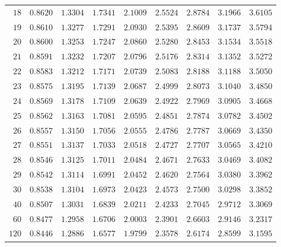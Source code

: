 \begin{tabular}{rrrrrrrrr}
  $18$ & $0.8620$ & $1.3304$ & $1.7341$ & $2.1009$ & $2.5524$ & $2.8784$ & $3.1966$ & $3.6105$ \\ 
  $19$ & $0.8610$ & $1.3277$ & $1.7291$ & $2.0930$ & $2.5395$ & $2.8609$ & $3.1737$ & $3.5794$ \\ 
  $20$ & $0.8600$ & $1.3253$ & $1.7247$ & $2.0860$ & $2.5280$ & $2.8453$ & $3.1534$ & $3.5518$ \\ 
  $21$ & $0.8591$ & $1.3232$ & $1.7207$ & $2.0796$ & $2.5176$ & $2.8314$ & $3.1352$ & $3.5272$ \\ 
  $22$ & $0.8583$ & $1.3212$ & $1.7171$ & $2.0739$ & $2.5083$ & $2.8188$ & $3.1188$ & $3.5050$ \\ 
  $23$ & $0.8575$ & $1.3195$ & $1.7139$ & $2.0687$ & $2.4999$ & $2.8073$ & $3.1040$ & $3.4850$ \\ 
  $24$ & $0.8569$ & $1.3178$ & $1.7109$ & $2.0639$ & $2.4922$ & $2.7969$ & $3.0905$ & $3.4668$ \\ 
  $25$ & $0.8562$ & $1.3163$ & $1.7081$ & $2.0595$ & $2.4851$ & $2.7874$ & $3.0782$ & $3.4502$ \\ 
  $26$ & $0.8557$ & $1.3150$ & $1.7056$ & $2.0555$ & $2.4786$ & $2.7787$ & $3.0669$ & $3.4350$ \\ 
  $27$ & $0.8551$ & $1.3137$ & $1.7033$ & $2.0518$ & $2.4727$ & $2.7707$ & $3.0565$ & $3.4210$ \\ 
  $28$ & $0.8546$ & $1.3125$ & $1.7011$ & $2.0484$ & $2.4671$ & $2.7633$ & $3.0469$ & $3.4082$ \\ 
  $29$ & $0.8542$ & $1.3114$ & $1.6991$ & $2.0452$ & $2.4620$ & $2.7564$ & $3.0380$ & $3.3962$ \\ 
  $30$ & $0.8538$ & $1.3104$ & $1.6973$ & $2.0423$ & $2.4573$ & $2.7500$ & $3.0298$ & $3.3852$ \\ 
  $40$ & $0.8507$ & $1.3031$ & $1.6839$ & $2.0211$ & $2.4233$ & $2.7045$ & $2.9712$ & $3.3069$ \\ 
  $60$ & $0.8477$ & $1.2958$ & $1.6706$ & $2.0003$ & $2.3901$ & $2.6603$ & $2.9146$ & $3.2317$ \\ 
  $120$ & $0.8446$ & $1.2886$ & $1.6577$ & $1.9799$ & $2.3578$ & $2.6174$ & $2.8599$ & $3.1595$ \\ 
   \hline
\end{tabular}
